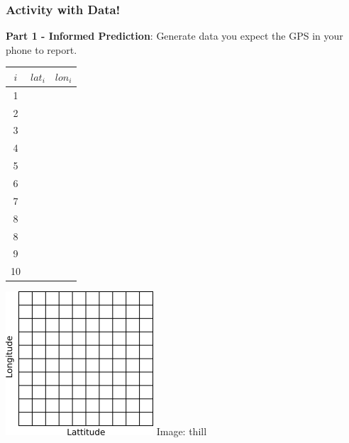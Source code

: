 \documentclass[fleqn]{beamer} %
\newcommand{\sectiontitleIV}{Activity with Data!}
\begin{document}
	\begin{frame}[label=sectionIV]
		\frametitle{\sectiontitleIV}
		\scriptsize
		{\bf Part 1 - Informed Prediction}: Generate data you expect the GPS in your phone to report. \\
		
		\begin{multicols}{2}
			\setlength{\tabcolsep}{20pt}
			\renewcommand{\arraystretch}{1.4}
			\begin{tabular}{|c|c|c|} \hline
			$i$ & $lat_i$ & $lon_i$ \\\hline
			  1  & &              \\ \hline
			  2  & &              \\ \hline
			  3  & &              \\ \hline
			  4  & &              \\ \hline
			  5  & &              \\ \hline
			  6  & &              \\ \hline
			  7  & &              \\ \hline
			  8  & &              \\ \hline
			  8  & &              \\ \hline		
			  9  & &              \\ \hline
             10  & &              \\ \hline
			\end{tabular}

			\includegraphics[scale=1]{lat_lon_grid.png}
			{\tiny Image: thill}
		\end{multicols}	

	\end{frame}
\end{document}
